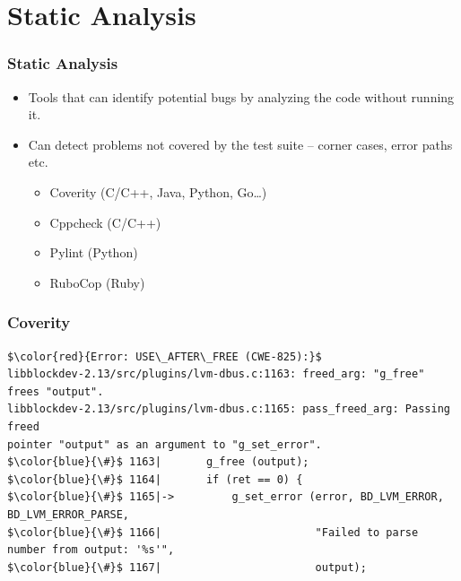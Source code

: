 \documentclass[aspectratio=169]{beamer}
\begin{document}
\section{Static Analysis}

\begin{frame}
	\frametitle{Static Analysis}

	\begin{block}{}
		\begin{itemize}
			\item Tools that can identify potential bugs by analyzing the code without running it.
			\item Can detect problems not covered by the test suite -- corner cases, error paths etc.
				\begin{itemize}
					\item Coverity (C/C++, Java, Python, Go…)\footnotemark
					\item Cppcheck (C/C++)\footnotemark
					\item Pylint (Python)\footnotemark
					\item RuboCop (Ruby)\footnotemark
				\end{itemize}
		\end{itemize}
	\end{block}


\end{frame}

\begin{frame}[fragile]
	\frametitle{Coverity}
\begin{lstlisting}[frame=none, basicstyle=\ttfamily\small, escapechar=$, columns=fullflexible, keepspaces=true]
$\color{red}{Error: USE\_AFTER\_FREE (CWE-825):}$
libblockdev-2.13/src/plugins/lvm-dbus.c:1163: freed_arg: "g_free" 
frees "output".
libblockdev-2.13/src/plugins/lvm-dbus.c:1165: pass_freed_arg: Passing freed 
pointer "output" as an argument to "g_set_error".
$\color{blue}{\#}$ 1163|       g_free (output);
$\color{blue}{\#}$ 1164|       if (ret == 0) {
$\color{blue}{\#}$ 1165|->         g_set_error (error, BD_LVM_ERROR, BD_LVM_ERROR_PARSE,
$\color{blue}{\#}$ 1166|                        "Failed to parse number from output: '%s'",
$\color{blue}{\#}$ 1167|                        output);
\end{lstlisting}

\end{frame}
\end{document}
